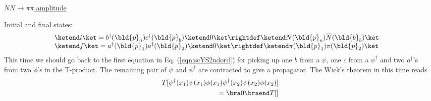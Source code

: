 \bigskip
\noindent
\underline{$N\overline{N} \to \pi \pi$ amplitude}

\bigskip

Initial and final states:
\begin{eqnarray}
\begin{array}{l}
\ketend i \ket
=
b^\dagger(\bld{p}_a) c^\dagger(\bld{p}_b) \ketend 0 \ket
\rightdef
\ketend N(\bld{p}_a) \overline{N}(\bld{b}_b )\ket
\\
\ketend f \ket
=
a^\dagger(\bld{p}_1) a^\dagger(\bld{p}_2) \ketend 0 \ket
\rightdef
\ketend \pi(\bld{p}_1) \pi (\bld{p}_2) \ket
\end{array}
\label{eqn:scYNNbarPiPiinit}
\end{eqnarray}
This time we should go back to the first equation in Eq. (\ref{eqn:scYS2ndord})
for picking up
one $b$ from a $\psi$, one $c$ from a $\psi^\dagger$ and two $a^\dagger$'s from 
two $\phi$'s in the T-product. The remaining pair of $\psi$ and $\psi^\dagger$ are
contracted to give a propagator. The Wick's theorem in this time reads
\begin{eqnarray}
&&
T[
\psi^\dagger(x_1) \psi(x_1) \phi(x_1)
\psi^\dagger(x_2) \psi(x_2) \phi(x_2)
]
\nonumber\\
&&
= 
\bra 0 \braend T[]
\end{eqnarray}








